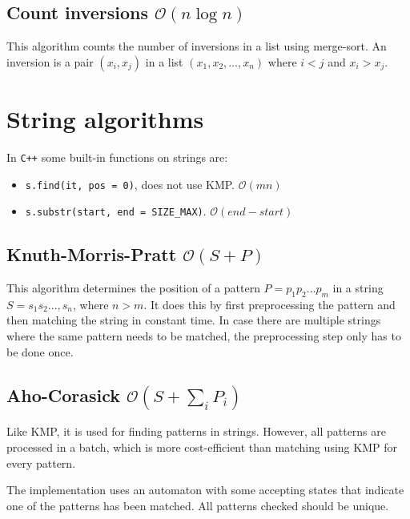 \subsection{Count inversions $\mathcal O(n\log n)$}

This algorithm counts the number of inversions in a list using merge-sort. An inversion is a pair $(x_i, x_j)$ in a list $(x_1, x_2, \dots, x_n)$ where $i < j$ and $x_i > x_j$.





\section{String algorithms}

In \texttt{C++} some built-in functions on strings are:
\begin{itemize}
    \item \texttt{s.find(it, pos = 0)}, does not use KMP. $\mathcal O(mn)$
    \item \texttt{s.substr(start, end = SIZE\_MAX)}. $\mathcal O(end - start)$
\end{itemize}

\subsection{Knuth-Morris-Pratt $\mathcal O(S + P)$}

This algorithm determines the position of a pattern $P = p_1p_2\dots p_m$ in a string $S = s_1s_2\dots, s_n$, where $n > m$. It does this by first preprocessing the pattern and then matching the string in constant time. In case there are multiple strings where the same pattern needs to be matched, the preprocessing step only has to be done once.



\subsection{Aho-Corasick $\mathcal O(S + \sum_i P_i)$}

Like KMP, it is used for finding patterns in strings. However, all patterns are processed in a batch, which is more cost-efficient than matching using KMP for every pattern.

The implementation uses an automaton with some accepting states that indicate one of the patterns has been matched. All patterns checked should be unique.



